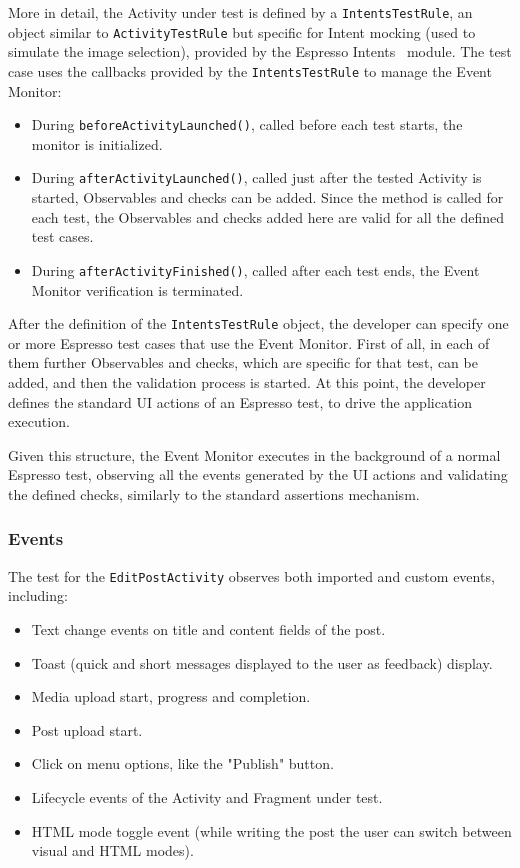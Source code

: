 \documentclass[11pt,a4paper,notitlepage]{article}
\begin{document}
More in detail, the Activity under test is defined by a \texttt{IntentsTestRule}, an object similar to \texttt{ActivityTestRule} but specific for Intent mocking (used to simulate the image selection), provided by the Espresso Intents~\cite{EspressoIntents} module. The test case uses the callbacks provided by the \texttt{IntentsTestRule} to manage the Event Monitor:
\begin{itemize}
	\item During \texttt{beforeActivityLaunched()}, called before each test starts, the monitor is initialized.
	\item During \texttt{afterActivityLaunched()}, called just after the tested Activity is started, Observables and checks can be added. Since the method is called for each test, the Observables and checks added here are valid for all the defined test cases.
	\item During \texttt{afterActivityFinished()}, called after each test ends, the Event Monitor verification is terminated.
\end{itemize}
After the definition of the \texttt{IntentsTestRule} object, the developer can specify one or more Espresso test cases that use the Event Monitor. First of all, in each of them further Observables and checks, which are specific for that test, can be added, and then the validation process is started. At this point, the developer defines the standard UI actions of an Espresso test, to drive the application execution.

Given this structure, the Event Monitor executes in the background of a normal Espresso test, observing all the events generated by the UI actions and validating the defined checks, similarly to the standard assertions mechanism.

\subsubsection{Events}
The test for the \texttt{EditPostActivity} observes both imported and custom events, including:
\begin{itemize}
	\item Text change events on title and content fields of the post.
	\item Toast (quick and short messages displayed to the user as feedback) display.
	\item Media upload start, progress and completion.
	\item Post upload start.
	\item Click on menu options, like the "Publish" button.
	\item Lifecycle events of the Activity and Fragment under test.
	\item HTML mode toggle event (while writing the post the user can switch between visual and HTML modes).
\end{itemize}
\end{document}

